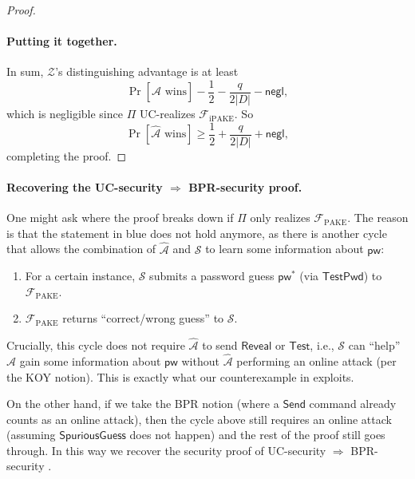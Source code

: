 \documentclass{article}
\newcommand{\negl}{\mathsf{negl}}
\newcommand{\adv}{\mathcal{A}}
\newcommand{\env}{\mathcal{Z}}
\renewcommand{\sim}{\mathcal{S}}
\newcommand{\func}{\mathcal{F}}
\newcommand{\Fpake}{\func_\mathrm{PAKE}}
\newcommand{\Fipake}{\func_\mathrm{iPAKE}}
\newcommand{\pw}{\mathsf{pw}}
\newcommand{\TestPwd}{\mathsf{TestPwd}}
\newcommand{\Send}{\mathsf{Send}}
\newcommand{\Reveal}{\mathsf{Reveal}}
\newcommand{\Test}{\mathsf{Test}}
\newcommand{\SpuriousGuess}{\mathsf{SpuriousGuess}}
\begin{document}
\begin{proof}
\paragraph{Putting it together.}
In sum, $\env$'s distinguishing advantage is at least
\[
\Pr[\widehat{\adv}\text{ wins}] - \frac{1}{2} - \frac{q}{2|D|} - \negl,
\]
which is negligible since $\Pi$ UC-realizes $\Fipake$. So
\[
\Pr[\widehat{\adv}\text{ wins}] \geq \frac{1}{2} + \frac{q}{2|D|} + \negl,
\]
completing the proof.
\end{proof}
\paragraph{Recovering the UC-security $\Rightarrow$ BPR-security proof.} One might ask where the proof breaks down if $\Pi$ only realizes $\Fpake$. The reason is that the statement in blue does not hold anymore, as there is another cycle that allows the combination of $\widehat{\adv}$ and $\sim$ to learn some information about $\pw$:
\begin{enumerate}
  \item For a certain instance, $\sim$ submits a password guess $\pw^*$ (via $\TestPwd$) to $\Fpake$.
  \item $\Fpake$ returns ``correct/wrong guess'' to $\sim$.
\end{enumerate}
Crucially, this cycle does not require $\widehat{\adv}$ to send $\Reveal$ or $\Test$, i.e., $\sim$ can ``help'' $\widehat{\adv}$ gain some information about $\pw$ without $\widehat{\adv}$ performing an online attack (per the KOY notion). This is exactly what our counterexample in  exploits.

On the other hand, if we take the BPR notion (where a $\Send$ command already counts as an online attack), then the cycle above still requires an online attack (assuming $\SpuriousGuess$ does not happen) and the rest of the proof still goes through. In this way we recover the security proof of UC-security $\Rightarrow$ BPR-security \cite{EC:CHKLM05}.



\end{document}
